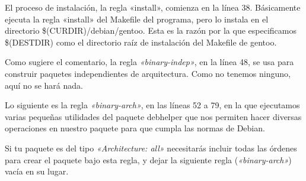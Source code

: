 \documentclass[letterpaper,12pt,spanish]{manual}
\begin{document}
El proceso de instalación, la regla «install», comienza en la línea 38. Básicamente ejecuta la regla «install» del Makefile del programa, pero lo instala en el directorio \$(CURDIR)/debian/gentoo. Esta es la razón por la que especificamos \$(DESTDIR) como el directorio raíz de instalación del Makefile de gentoo.

Como sugiere el comentario, la regla \emph{«binary-indep»}, en la línea 48, se usa para construir paquetes independientes de arquitectura. Como no tenemos ninguno, aquí no se hará nada.

Lo siguiente es la regla \emph{«binary-arch»}, en las líneas 52 a 79, en la que ejecutamos varias pequeñas utilidades del paquete debhelper que nos permiten hacer diversas operaciones en nuestro paquete para que cumpla las normas de Debian.

Si tu paquete es del tipo \emph{«Architecture: all»} necesitarás incluir todas las órdenes para crear el paquete bajo esta regla, y dejar la siguiente regla (\emph{«binary-arch»}) vacía en su lugar.
\end{document}
